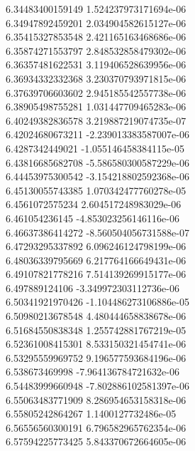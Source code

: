 {6.34483400159149 1.524237973171694e-06
 \\
6.34947892459201 2.034904582615127e-06
 \\
6.35415327853548 2.421165163468686e-06
 \\
6.35874271553797 2.848532858479302e-06
 \\
6.36357481622531 3.119406528639956e-06
 \\
6.36934332332368 3.230370793971815e-06
 \\
6.37639706603602 2.945185542557738e-06
 \\
6.38905498755281 1.031447709465283e-06
 \\
6.40249382836578 3.219887219074735e-07
 \\
6.42024680673211 -2.239013383587007e-06
 \\
6.4287342449021 -1.055146458384115e-05
 \\
6.43816685682708 -5.586580300587229e-06
 \\
6.44453975300542 -3.154218802592368e-06
 \\
6.45130055743385 1.070342477760278e-05
 \\
6.4561072575234 2.604517248983029e-06
 \\
6.461054236145 -4.853023256146116e-06
 \\
6.46637386414272 -8.560504056731588e-07
 \\
6.47293295337892 6.096246124798199e-06
 \\
6.48036339795669 6.217764166649431e-06
 \\
6.49107821778216 7.514139269915177e-06
 \\
6.497889124106 -3.349972303112736e-06
 \\
6.50341921970426 -1.104486273106886e-05
 \\
6.50980213678548 4.480444658838678e-06
 \\
6.51684550838348 1.255742881767219e-05
 \\
6.52361008415301 8.533150321454741e-06
 \\
6.53295559969752 9.196577593684196e-06
 \\
6.538673469998 -7.964136784721632e-06
 \\
6.54483999660948 -7.802886102581397e-06
 \\
6.55063483771909 8.286954653158318e-06
 \\
6.55805242864267 1.1400127732486e-05
 \\
6.56556560300191 6.796582965762354e-06
 \\
6.57594225773425 5.843370672664605e-06
}
